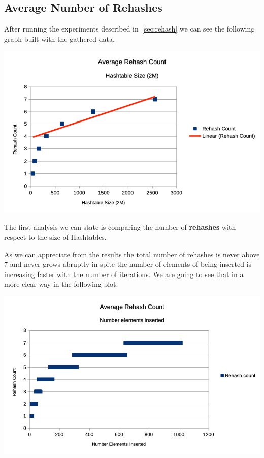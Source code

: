 \documentclass[12pt, a4paper]{article}
\begin{document}
\subsection{Average Number of Rehashes}
After running the experiments described in~\ref{sec:rehash} we can see the following graph built with the gathered data.


\begin{minipage}[t]{\linewidth}
  \includegraphics[width=\textwidth]{average_rehash_count_2m}
  \label{fig:rehash_avg_2m}
\end{minipage}


The first analysis we can state is comparing the number of \textbf{rehashes} with respect to the size of Hashtables.

As we can appreciate from the results the total number of rehashes is never above $7$ and never grows abruptly in spite the number of elements of being inserted is increasing faster with the number of iterations. We are going to see that in a more clear way in the following plot.

\begin{minipage}[t]{\linewidth}
  \includegraphics[width=\textwidth]{average_rehash_count_n}
  \label{fig:rehash_avg_n}
\end{minipage}
\end{document}
